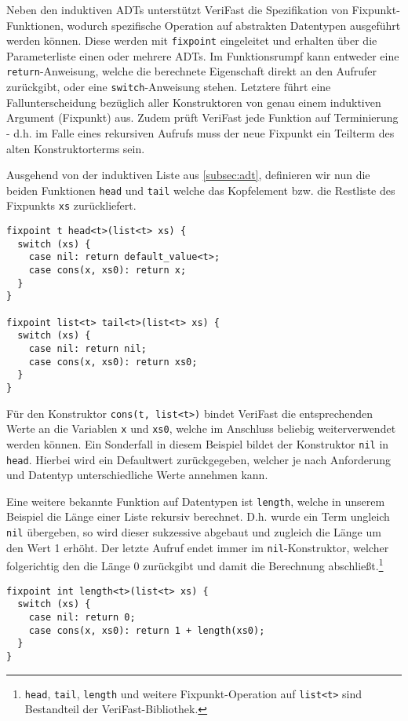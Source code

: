 Neben den induktiven ADTs unterstützt VeriFast die Spezifikation von Fix\-punkt-Funktionen, wodurch spezifische Operation auf abstrakten Datentypen ausgeführt werden können. Diese werden mit \texttt{fixpoint} eingeleitet und erhalten über die Parameterliste einen oder mehrere ADTs. Im Funktionsrumpf kann entweder eine \texttt{return}-Anweisung, welche die berechnete Eigenschaft direkt an den Aufrufer zurückgibt, oder eine \texttt{switch}-Anweisung stehen. Letztere führt eine Fallunterscheidung bezüglich aller Konstruktoren von genau einem induktiven Argument (Fixpunkt) aus. Zudem prüft VeriFast jede Funktion auf Terminierung - d.h. im Falle eines rekursiven Aufrufs muss der neue Fixpunkt ein Teilterm des alten Konstruktorterms sein. \cite{Jacobs2010}

Ausgehend von der induktiven Liste aus \cref{subsec:adt}, definieren wir nun die beiden Funktionen \texttt{head} und \texttt{tail} welche das Kopfelement bzw. die Restliste des Fixpunkts \texttt{xs} zurückliefert.

\begin{lstlisting}
fixpoint t head<t>(list<t> xs) {
  switch (xs) {
    case nil: return default_value<t>;
    case cons(x, xs0): return x;
  }
}

fixpoint list<t> tail<t>(list<t> xs) {
  switch (xs) {
    case nil: return nil;
    case cons(x, xs0): return xs0;
  }
}
\end{lstlisting}

\noindent
Für den Konstruktor \texttt{cons(t, list<t>)} bindet VeriFast die entsprechenden Werte an die Variablen \texttt{x} und \texttt{xs0}, welche im Anschluss beliebig weiterverwendet werden können. Ein Sonderfall in diesem Beispiel bildet der Konstruktor \texttt{nil} in \texttt{head}. Hierbei wird ein Defaultwert zurückgegeben, welcher je nach Anforderung und Datentyp unterschiedliche Werte annehmen kann.

Eine weitere bekannte Funktion auf Datentypen ist \texttt{length}, welche in unserem Beispiel die Länge einer Liste rekursiv berechnet. D.h. wurde ein Term ungleich \texttt{nil} übergeben, so wird dieser sukzessive abgebaut und zugleich die Länge um den Wert 1 erhöht. Der letzte Aufruf endet immer im \texttt{nil}-Konstruktor, welcher folgerichtig den die Länge 0 zurückgibt und damit die Berechnung abschließt.\footnote{\texttt{head}, \texttt{tail}, \texttt{length} und weitere Fixpunkt-Operation auf \texttt{list<t>} sind Bestandteil der VeriFast-Bibliothek.}

\begin{lstlisting}
fixpoint int length<t>(list<t> xs) {
  switch (xs) {
    case nil: return 0;
    case cons(x, xs0): return 1 + length(xs0);
  }
}
\end{lstlisting}

